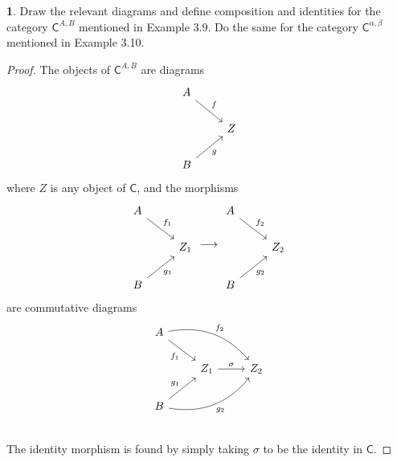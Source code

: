 \documentclass{article}
\newcounter{section-number}
\theoremstyle{definition}
\newtheorem{ex}{}[section-number]
\begin{document}
\begin{ex}
	Draw the relevant diagrams and define composition and identities for the category $\mathsf{C}^{A, B}$ mentioned in Example 3.9.
	Do the same for the category $\mathsf{C}^{\alpha, \beta}$ mentioned in Example 3.10.
\end{ex}
\begin{proof}
	The objects of $\mathsf{C}^{A, B}$ are diagrams \begin{equation*}
		\begin{tikzcd}
			A \arrow[dr, "f"] \\
			& Z \\
			B \arrow[ur, "g"']
		\end{tikzcd}
	\end{equation*}
	where $Z$ is any object of $\mathsf{C}$, and the morphisms \begin{equation*}
		\begin{tikzcd}
			A \arrow[dr, "f_1"]  & \\
			& Z_1 \\
			B \arrow[ur, "g_1"'] &
		\end{tikzcd}
		\longrightarrow
		\begin{tikzcd}
			A \arrow[dr, "f_2"]  & \\
			& Z_2 \\
			B \arrow[ur, "g_2"'] &
		\end{tikzcd}
	\end{equation*}
	are commutative diagrams \begin{equation*}
		\begin{tikzcd}
			A \arrow[dr, "f_1"'] \arrow[drr, bend left, "f_2"] \\
			& Z_1 \arrow[r, "\sigma"] & Z_2 \\
			B \arrow[ur, "g_1"] \arrow[urr, bend right, "g_2"'] \\
		\end{tikzcd}
	\end{equation*}
	The identity morphism is found by simply taking $\sigma$ to be the identity in $\mathsf{C}$.


\end{proof}
\end{document}
